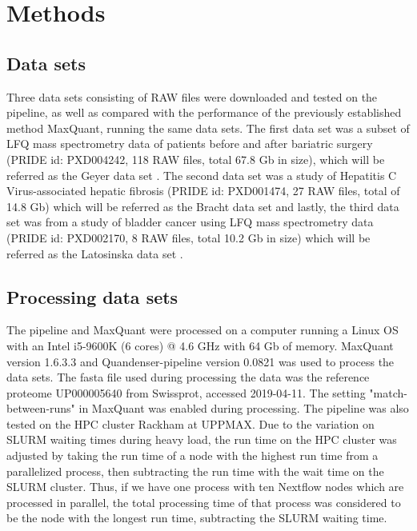 \documentclass[11pt]{article}
\begin{document}
\section*{Methods}

\subsection*{Data sets}
Three data sets consisting of RAW files were downloaded and tested on the pipeline, as well as compared with the performance of the previously established method MaxQuant, running the same data sets. The first data set was a subset of LFQ mass spectrometry data of patients before and after bariatric surgery (PRIDE id: PXD004242, 118 RAW files, total 67.8 Gb in size), which will be referred as the Geyer data set \cite{geyer2016bartric}.  The second data set was a study of Hepatitis C Virus-associated hepatic fibrosis (PRIDE id: PXD001474, 27 RAW files, total of 14.8 Gb) which will be referred as the Bracht data set and lastly, the third data set was from a study of bladder cancer using LFQ mass spectrometry data (PRIDE id: PXD002170, 8 RAW files, total 10.2 Gb in size) which will be referred as the Latosinska data set \cite{bracht2015analysis} \cite{latosinska2015comparative}.

\subsection*{Processing data sets}
The pipeline and MaxQuant were processed on a computer running a Linux OS with an Intel i5-9600K (6 cores) @ 4.6 GHz with 64 Gb of memory. MaxQuant version 1.6.3.3 and Quandenser-pipeline version 0.0821 was used to process the data sets. The fasta file used during processing the data was the reference proteome UP000005640 from Swissprot, accessed 2019-04-11. The setting "match-between-runs" in MaxQuant was enabled during processing. The pipeline was also tested on the HPC cluster Rackham at UPPMAX. Due to the variation on SLURM waiting times during heavy load, the run time on the HPC cluster was adjusted by taking the run time of a node with the highest run time from a parallelized process, then subtracting the run time with the wait time on the SLURM cluster. Thus, if we have one process with ten Nextflow nodes which are processed in parallel, the total processing time of that process was considered to be the node with the longest run time, subtracting the SLURM waiting time.
\end{document}
